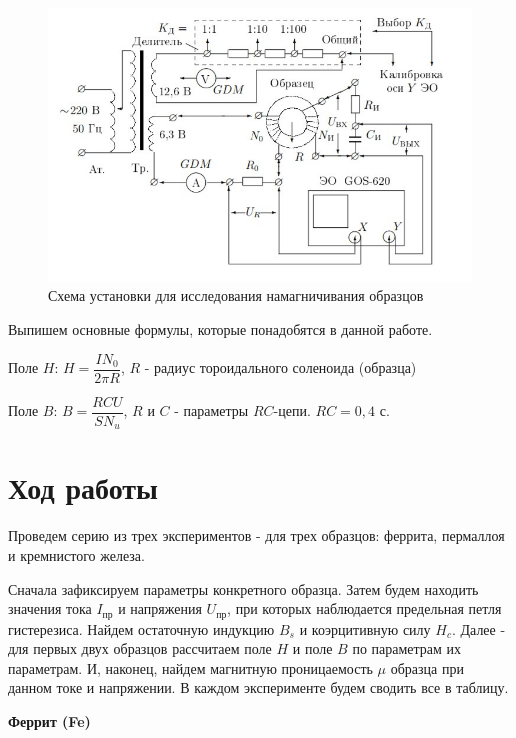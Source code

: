 \documentclass[a4paper,12pt]{article} %
\begin{document}
\begin{figure}[h!]
	\centering
	\includegraphics[width=\linewidth]{Pictures/Scheme.jpeg}
	\caption{Схема установки для исследования намагничивания образцов}
\end{figure}

\newpage
Выпишем основные формулы, которые понадобятся в данной работе.

Поле $H$:  $H = \dfrac{IN_0}{2\pi R}$,   $R$ - радиус тороидального соленоида (образца)

\vspace{7mm}
Поле $B$:  $B = \dfrac{RCU}{SN_u}$,      $R$ и $C$ - параметры $RC$-цепи. $RC = 0,4$ с.

\section*{Ход работы}

Проведем серию из трех экспериментов - для трех образцов: феррита, пермаллоя и кремнистого железа.

Сначала зафиксируем параметры конкретного образца. Затем будем находить значения тока $I_{\text{пр}}$ и напряжения $U_{\text{пр}}$, при которых наблюдается предельная петля гистерезиса. Найдем остаточную индукцию $B_s$ и коэрцитивную силу $H_c$. Далее - для первых двух образцов рассчитаем поле $H$ и поле $B$ по параметрам их параметрам. И, наконец, найдем магнитную проницаемость $\mu$ образца при данном токе и напряжении. В каждом эксперименте будем сводить все в таблицу.

\vspace{8mm}
\textbf{{\large Феррит (Fe)}}
\end{document}

